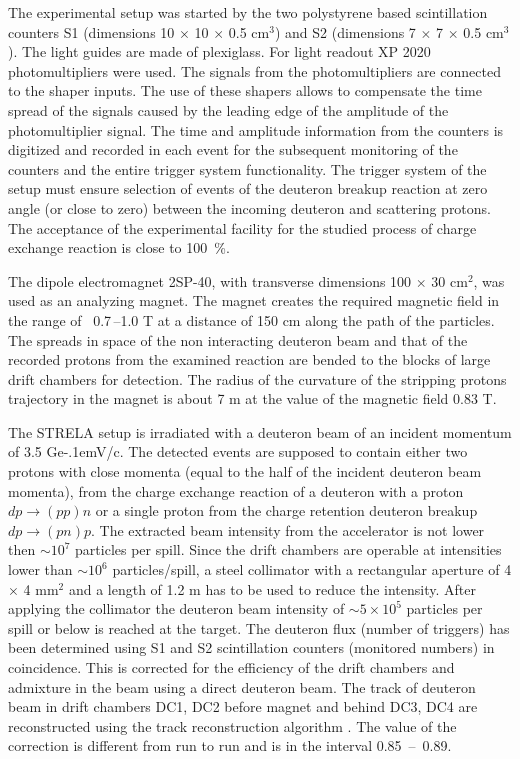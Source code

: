\documentclass[twocolumn,epjc3]{svjour3}
\newcommand{\dpchex} {\ensuremath{dp \rightarrow (pp)n}\xspace}
\newcommand{\dpret}  {\ensuremath{dp \rightarrow (pn)p}\xspace}
\newcommand{\GeVc}   {Ge\kern-.1emV/c\xspace}
\begin{document}
The experimental setup was started by the two polysty\-rene based scintillation
counters S1 (dimensions 10 $\times$ 10 $\times$ 0.5 cm$^3$) and S2 (dimensions 7
$\times$ 7 $\times$ 0.5 cm$^3$). The light guides are made of plexiglass. For
light readout XP 2020 photomultipliers were used. The signals from the
photomultipliers are connected to the shaper inputs. The use of these shapers
allows to compensate the time spread of the signals caused by the leading edge
of the amplitude of the photomultiplier signal. The time and amplitude
information from the counters is digitized and recorded in each event for the
subsequent monitoring of the counters and the entire trigger system
functionality. The trigger system of the setup must ensure selection of events
of the deuteron breakup reaction at zero angle (or close to zero) between the
incoming deuteron and scattering protons. The acceptance of the experimental
facility for the studied process of charge exchange reaction is close to 100~\%.

The dipole electromagnet 2SP-40, with transverse dimensions 100 $\times$ 30
cm$^2$, was used as an analyzing magnet. The magnet creates the required
magnetic field in the range of \ 0.7\,--1.0 T at a distance of 150 cm along the
path of the particles. The spreads in space of the non interacting deuteron beam
and that of the recorded protons from the examined reaction are bended to the
blocks of large drift chambers for detection. The radius of the curvature of the
stripping protons trajectory in the magnet is about 7 m at the value of the
magnetic field 0.83 T.

The STRELA setup is irradiated with a deuteron beam of an incident momentum of
3.5 \GeVc. The detected events are supposed to contain either two protons with
close momenta (equal to the half of the incident deuteron beam momenta), from
the charge exchange reaction of a deuteron with a proton \dpchex or a single
proton from the charge retention deuteron breakup \dpret. The extracted beam
intensity from the accelerator is not lower then $\sim 10^{7}$ particles per
spill. Since the drift chambers are operable at intensities lower than
$\sim 10^{6}$ particles/spill, a steel collimator with a rectangular aperture of
4 $\times$ 4 mm$^2$ and a length of 1.2 m has to be used to reduce the
intensity. After applying the collimator the deuteron beam intensity of
$\sim 5\times10^5$ particles per spill or below is reached at the target. The
deuteron flux (number of triggers) has been determined using S1 and S2
scintillation counters (monitored numbers) in coincidence. This is corrected for
the efficiency of the drift chambers and admixture in the beam using a direct
deuteron beam. The track of deuteron beam in drift chambers DC1, DC2 before
magnet and behind DC3, DC4 are reconstructed using the track reconstruction
algorithm \cite{gla13}. The value of the correction is different from run to run
and is in the interval 0.85~--~0.89.
\end{document}
